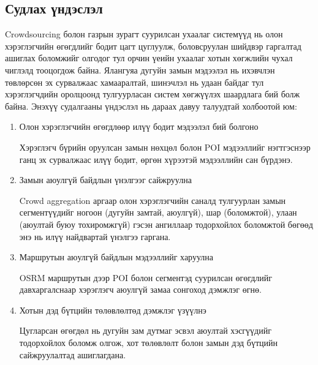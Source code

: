     \subsection*{Судлах үндэслэл}
        Crowdsourcing болон газрын зурагт суурилсан ухаалаг системүүд нь олон хэрэглэгчийн өгөгдлийг бодит цагт цуглуулж, боловсруулан шийдвэр гаргалтад ашиглах боломжийг олгодог тул орчин үеийн ухаалаг хотын хөгжлийн чухал чиглэлд тооцогдож байна. Ялангуяа дугуйн замын мэдээлэл нь ихэвчлэн төвлөрсөн эх сурвалжаас хамааралтай, шинэчлэл нь удаан байдаг тул хэрэглэгчдийн оролцоонд тулгуурласан систем хөгжүүлэх шаардлага бий болж байна.
        Энэхүү судалгааны үндэслэл нь дараах давуу талуудтай холбоотой юм:
        \begin{enumerate}[nosep]
            \item Олон хэрэглэгчийн өгөгдлөөр илүү бодит мэдээлэл бий болгоно
            \par Хэрэглэгч бүрийн оруулсан замын нөхцөл болон POI мэдээллийг нэгтгэснээр ганц эх сурвалжаас илүү бодит, өргөн хүрээтэй мэдээллийн сан бүрдэнэ.
            \item Замын аюулгүй байдлын үнэлгээг сайжруулна
            \par Crowd aggregation аргаар олон хэрэглэгчийн саналд тулгуурлан замын сегментүүдийг ногоон (дугуйн замтай, аюулгүй), шар (боломжтой), улаан (аюултай буюу тохиромжгүй) гэсэн ангиллаар тодорхойлох боломжтой бөгөөд энэ нь илүү найдвартай үнэлгээ гаргана.
            \item Маршрутын аюулгүй байдлын мэдээллийг харуулна
            \par OSRM маршрутын дээр POI болон сегментэд суурилсан өгөгдлийг давхаргалснаар хэрэглэгч аюулгүй замаа сонгоход дэмжлэг өгнө.
            \item Хотын дэд бүтцийн төлөвлөлтөд дэмжлэг үзүүлнэ
            \par Цугларсан өгөгдөл нь дугуйн зам дутмаг эсвэл аюултай хэсгүүдийг тодорхойлох боломж олгож, хот төлөвлөлт болон замын дэд бүтцийн сайжруулалтад ашиглагдана.
        \end{enumerate}

